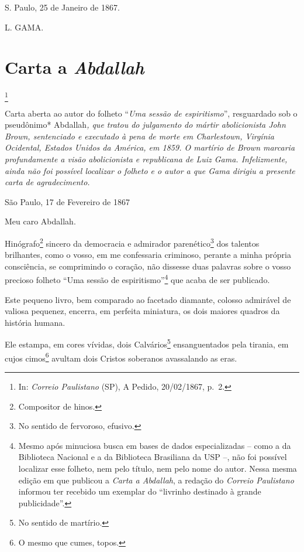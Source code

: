 S. Paulo, 25 de Janeiro de 1867.

L. GAMA.

\chapter{Carta a \emph{Abdallah}}\footnote{In: \emph{Correio Paulistano}
  (SP), A Pedido, 20/02/1867, p.~2.}

\begin{didascalia}
Carta aberta ao autor do folheto ``\emph{Uma sessão de espiritismo}'',
resguardado sob o pseudônimo* Abdallah\emph{, que tratou do julgamento
do mártir abolicionista John Brown, sentenciado e executado à pena de
morte em Charlestown, Virgínia Ocidental, Estados Unidos da América, em
1859. O martírio de Brown marcaria profundamente a visão abolicionista e
republicana de Luiz Gama. Infelizmente, ainda não foi possível localizar
o folheto e o autor a que Gama dirigiu a presente carta de
agradecimento.}
\end{didascalia}

\asterisc{}

São Paulo, 17 de Fevereiro de 1867

Meu caro Abdallah.

Hinógrafo\footnote{Compositor de hinos.} sincero da democracia e
admirador parenético\footnote{No sentido de fervoroso, efusivo.} dos
talentos brilhantes, como o vosso, em me confessaria criminoso, perante
a minha própria consciência, se comprimindo o coração, não dissesse duas
palavras sobre o vosso precioso folheto ``Uma sessão de
espiritismo''\footnote{Mesmo após minuciosa busca em bases de dados
  especializadas -- como a da Biblioteca Nacional e a da Biblioteca
  Brasiliana da USP --, não foi possível localizar esse folheto, nem
  pelo título, nem pelo nome do autor. Nessa mesma edição em que
  publicou a \emph{Carta a Abdallah}, a redação do \emph{Correio
  Paulistano} informou ter recebido um exemplar do ``livrinho destinado à
  grande publicidade''.} que acaba de ser publicado.

Este pequeno livro, bem comparado ao facetado diamante, colosso
admirável de valiosa pequenez, encerra, em perfeita miniatura, os dois
maiores quadros da história humana.

Ele estampa, em cores vívidas, dois Calvários\footnote{No sentido de
  martírio.} ensanguentados pela tirania, em cujos cimos\footnote{O
  mesmo que cumes, topos.} avultam dois Cristos soberanos avassalando as
eras.

